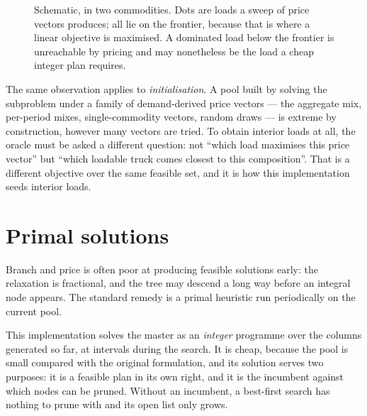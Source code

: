 \documentclass[11pt,a4paper]{article}
\newcommand{\conv}{\operatorname{conv}}
\begin{document}
\begin{figure}[h!]
\centering
{}
\caption{Schematic, in two commodities. Dots are loads a sweep of price vectors
produces; all lie on the frontier, because that is where a linear objective is
maximised. A dominated load below the frontier is unreachable by pricing and may
nonetheless be the load a cheap integer plan requires.}
\end{figure}

The same observation applies to \emph{initialisation}. A pool built by solving
the subproblem under a family of demand-derived price vectors --- the aggregate
mix, per-period mixes, single-commodity vectors, random draws --- is extreme by
construction, however many vectors are tried. To obtain interior loads at all,
the oracle must be asked a different question: not ``which load maximises this
price vector'' but ``which loadable truck comes closest to this composition''.
That is a different objective over the same feasible set, and it is how this
implementation seeds interior loads.

\section{Primal solutions}

Branch and price is often poor at producing feasible solutions early: the
relaxation is fractional, and the tree may descend a long way before an integral
node appears. The standard remedy is a primal heuristic run periodically on the
current pool.

This implementation solves the master as an \emph{integer} programme over the
columns generated so far, at intervals during the search. It is cheap, because
the pool is small compared with the original formulation, and its solution
serves two purposes: it is a feasible plan in its own right, and it is the
incumbent against which nodes can be pruned. Without an incumbent, a best-first
search has nothing to prune with and its open list only grows.
\end{document}
